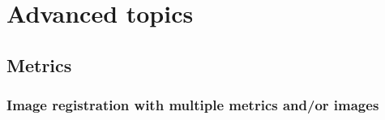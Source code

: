 \documentclass[]{report}
\begin{document}
%


\chapter{Advanced topics}\label{chp:advanced}

\section{Metrics}

\subsection{Image registration with multiple metrics and/or images}
\end{document}

